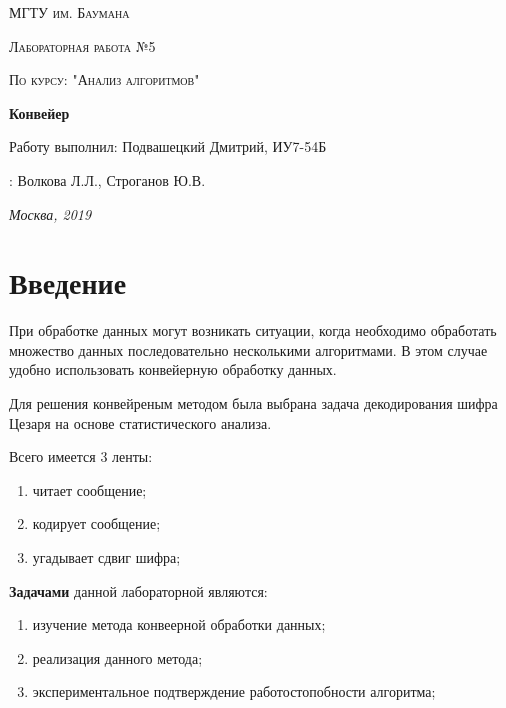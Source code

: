 \documentclass[12pt]{report}
\begin{document}
	
	
	\begin{titlepage}
		\centering
		{\scshape\LARGE МГТУ им. Баумана \par}
		\vspace{3cm}
		{\scshape\Large Лабораторная работа №5\par}
		\vspace{0.5cm}	
		{\scshape\Large По курсу: "Анализ алгоритмов"\par}
		\vspace{1.5cm}
		{\huge\bfseries Конвейер\par}
		\vspace{2cm}
		\Large Работу выполнил: Подвашецкий Дмитрий, ИУ7-54Б\par
		\vspace{0.5cm}
		:  Волкова Л.Л., Строганов Ю.В.\par
		
		\vfill
		\large \textit {Москва, 2019} \par
	\end{titlepage}
	
	\tableofcontents
	
	\newpage
	\chapter*{Введение}
	
	 При обработке данных могут возникать ситуации, когда необходимо обработать множество данных последовательно несколькими алгоритмами. В этом случае удобно использовать конвейерную обработку данных. 
	 
	 Для решения конвейреным методом была выбрана задача декодирования шифра Цезаря на основе статистического анализа.
	 
	 Всего имеется 3 ленты:
	 \begin{enumerate}
	 	\item читает сообщение;
	 	\item кодирует сообщение;
	 	\item угадывает сдвиг шифра;
	 \end{enumerate}
	 
	 \textbf{Задачами} данной лабораторной являются:
	 \begin{enumerate}
	 	\item изучение метода конвеерной обработки данных;
	 	\item реализация данного метода;
	 	\item экспериментальное подтверждение работостопобности алгоритма;
	 \end{enumerate}
\end{document}
